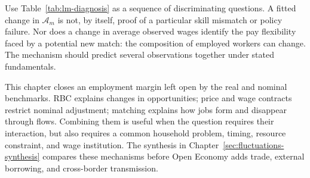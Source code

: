 Use Table~\ref{tab:lm-diagnosis} as a sequence of discriminating questions.
A fitted change in $\mathcal A_m$ is not, by itself, proof of a particular
skill mismatch or policy failure. Nor does a change in average observed wages
identify the pay flexibility faced by a potential new match: the composition
of employed workers can change. The mechanism should predict several
observations together under stated fundamentals.

This chapter closes an employment margin left open by the real and nominal
benchmarks. RBC explains changes in opportunities; price and wage contracts
restrict nominal adjustment; matching explains how jobs form and disappear
through flows. Combining them is useful when the question requires their
interaction, but also requires a common household problem, timing, resource
constraint, and wage institution. The synthesis in
Chapter~\ref{sec:fluctuations-synthesis} compares these mechanisms before
Open Economy adds trade, external borrowing, and cross-border transmission.
